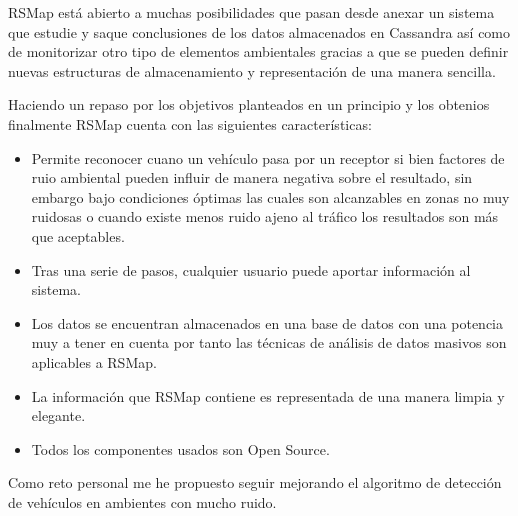 RSMap está abierto a muchas posibilidades que pasan desde anexar un sistema que estudie y saque conclusiones de los datos almacenados en Cassandra así como de monitorizar otro tipo de elementos ambientales gracias a que se pueden definir nuevas estructuras de almacenamiento y representación de una manera sencilla.

\bigskip

Haciendo un repaso por los objetivos planteados en un principio y los obtenios finalmente RSMap cuenta con las siguientes características:

\begin{itemize}
\item Permite reconocer cuano un vehículo pasa por un receptor si bien factores de ruio ambiental pueden influir de manera negativa sobre el resultado, sin embargo bajo condiciones óptimas las cuales son alcanzables en zonas no muy ruidosas o cuando existe menos ruido ajeno al tráfico los resultados son más que aceptables.
\item Tras una serie de pasos, cualquier usuario puede aportar información al sistema.
\item Los datos se encuentran almacenados en una base de datos con una potencia muy a tener en cuenta por tanto las técnicas de análisis de datos masivos son aplicables a RSMap.
\item La información que RSMap contiene es representada de una manera limpia y elegante.
\item Todos los componentes usados son Open Source.
\end{itemize}

Como reto personal me he propuesto seguir mejorando el algoritmo de detección de vehículos en ambientes con mucho ruido.
